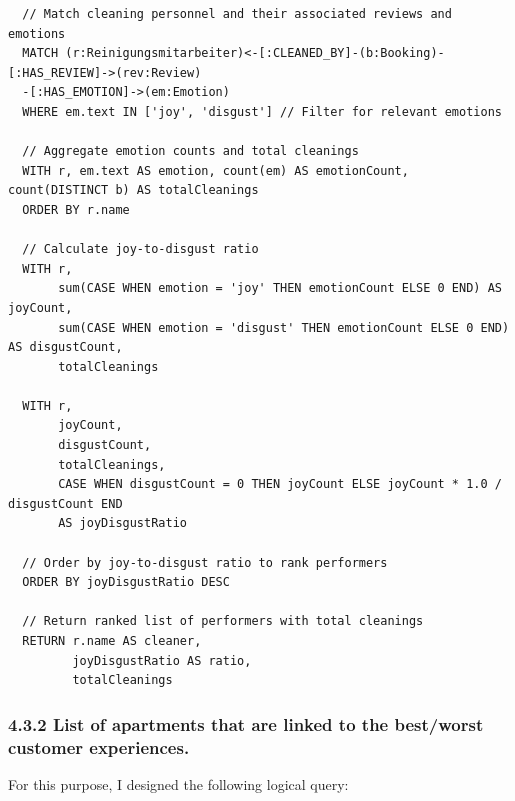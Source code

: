 \documentclass[
]{article}
\begin{document}
\begin{lstlisting}
  // Match cleaning personnel and their associated reviews and emotions
  MATCH (r:Reinigungsmitarbeiter)<-[:CLEANED_BY]-(b:Booking)-[:HAS_REVIEW]->(rev:Review)
  -[:HAS_EMOTION]->(em:Emotion)
  WHERE em.text IN ['joy', 'disgust'] // Filter for relevant emotions
  
  // Aggregate emotion counts and total cleanings
  WITH r, em.text AS emotion, count(em) AS emotionCount, count(DISTINCT b) AS totalCleanings
  ORDER BY r.name
  
  // Calculate joy-to-disgust ratio
  WITH r, 
       sum(CASE WHEN emotion = 'joy' THEN emotionCount ELSE 0 END) AS joyCount,
       sum(CASE WHEN emotion = 'disgust' THEN emotionCount ELSE 0 END) AS disgustCount,
       totalCleanings
  
  WITH r, 
       joyCount, 
       disgustCount, 
       totalCleanings,
       CASE WHEN disgustCount = 0 THEN joyCount ELSE joyCount * 1.0 / disgustCount END 
       AS joyDisgustRatio
  
  // Order by joy-to-disgust ratio to rank performers
  ORDER BY joyDisgustRatio DESC
  
  // Return ranked list of performers with total cleanings
  RETURN r.name AS cleaner, 
         joyDisgustRatio AS ratio, 
         totalCleanings
  \end{lstlisting}
  
  \subsubsection{4.3.2 List of apartments that are linked to the best/worst customer experiences.}\label{list-of-apartments-that-are-linked-to-the-bestworst-customer-experiences.}
  
  For this purpose, I designed the following logical query:

  \vspace*{10mm}
  
\end{document}
